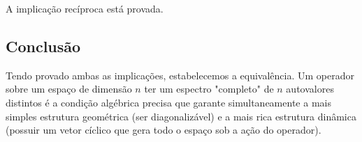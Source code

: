 A implicação recíproca está provada.

\subsection*{Conclusão}

Tendo provado ambas as implicações, estabelecemos a equivalência. Um operador sobre um espaço
de dimensão $n$ ter um espectro "completo" de $n$ autovalores distintos é a condição algébrica precisa
que garante simultaneamente a mais simples estrutura geométrica (ser diagonalizável) e a mais rica
estrutura dinâmica (possuir um vetor cíclico que gera todo o espaço sob a ação do operador).